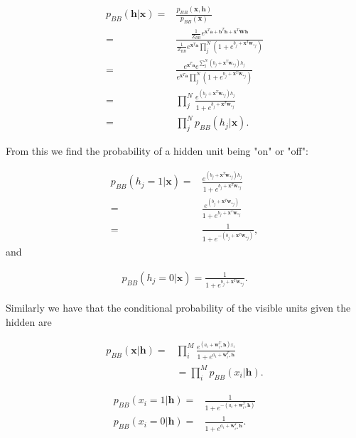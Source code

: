 \documentclass[%
oneside,                 %
final,                   %
10pt]{article}
\begin{document}
\begin{align}
	p_{BB} (\bm{h}|\bm{x}) =& \frac{p_{BB} (\bm{x}, \bm{h})}{p_{BB} (\bm{x})} \nonumber \\
	=& \frac{ \frac{1}{Z_{BB}}  e^{\bm{x}^T \bm{a} + \bm{b}^T \bm{h} + \bm{x}^T \bm{W} \bm{h}} }
	        {\frac{1}{Z_{BB}} e^{\bm{x}^T \bm{a}} \prod_j^N (1 + e^{b_j + \bm{x}^T \bm{w}_{\ast j}})} \nonumber \\
	=& \frac{  e^{\bm{x}^T \bm{a}} e^{ \sum_j^N (b_j + \bm{x}^T \bm{w}_{\ast j} ) h_j} }
	        { e^{\bm{x}^T \bm{a}} \prod_j^N (1 + e^{b_j + \bm{x}^T \bm{w}_{\ast j}})} \nonumber \\
	=& \prod_j^N \frac{ e^{(b_j + \bm{x}^T \bm{w}_{\ast j} ) h_j}  }
	{1 + e^{b_j + \bm{x}^T \bm{w}_{\ast j}}} \nonumber \\
	=& \prod_j^N p_{BB} (h_j| \bm{x}) .
\end{align}

From this we find the probability of a hidden unit being "on" or "off":

\begin{align}
	p_{BB} (h_j=1 | \bm{x}) =&   \frac{ e^{(b_j + \bm{x}^T \bm{w}_{\ast j} ) h_j}  }
	{1 + e^{b_j + \bm{x}^T \bm{w}_{\ast j}}} \\
	=&  \frac{ e^{(b_j + \bm{x}^T \bm{w}_{\ast j} )}  }
	{1 + e^{b_j + \bm{x}^T \bm{w}_{\ast j}}} \\
	=&  \frac{ 1 }{1 + e^{-(b_j + \bm{x}^T \bm{w}_{\ast j})} } ,
\end{align}
and

\begin{align}
	p_{BB} (h_j=0 | \bm{x}) =\frac{ 1 }{1 + e^{b_j + \bm{x}^T \bm{w}_{\ast j}} } .
\end{align}


Similarly we have that the conditional probability of the visible units given the hidden are

\begin{align}
	p_{BB} (\bm{x}|\bm{h}) =& \prod_i^M \frac{ e^{ (a_i + \bm{w}_{i\ast}^T \bm{h}) x_i} }{ 1 + e^{a_i + \bm{w}_{i\ast}^T \bm{h}} } \\
	&= \prod_i^M p_{BB} (x_i | \bm{h}) .
\end{align}


\begin{align}
	p_{BB} (x_i=1 | \bm{h}) =& \frac{1}{1 + e^{-(a_i + \bm{w}_{i\ast}^T \bm{h} )}} \\
	p_{BB} (x_i=0 | \bm{h}) =& \frac{1}{1 + e^{a_i + \bm{w}_{i\ast}^T \bm{h} }} .
\end{align}
\end{document}
